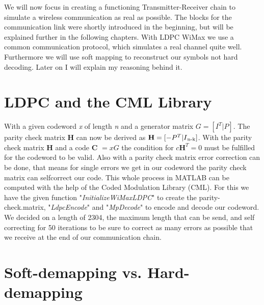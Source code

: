 \documentclass[12pt,oneside, reqno]{report}
\begin{document}
We will now focus in creating a functioning Transmitter-Receiver chain to simulate a wireless communication as real as possible. The blocks for the communication link were shortly introduced in the beginning, but will be explained further in the following chapters. With LDPC WiMax we use a common communication protocol, which simulates a real channel quite well. Furthermore we will use soft mapping to reconstruct our symbols not hard decoding. Later on I will explain my reasoning behind it.  

\section{LDPC and the CML Library}
With a given codeword \textit{x} of length \textit{n} and a generator matrix $G = [I^T|P]$. The parity check matrix \textbf{H} can now be derived as $\textbf{H} = [-P^T|I\textsubscript{n-k}]$. With the parity check matrix \textbf{H} and a code \textbf{C} $= xG$ the condition for $c\textbf{H}^T = 0$ must be fulfilled for the codeword to be valid. 
\newline 
Also with a parity check matrix error correction can be done, that means for single errors we get in our codeword the parity check matrix can selfcorrect our code.
This whole process in MATLAB can be computed with the help of the Coded Modulation Library (CML). For this we have the given function "\textit{InitializeWiMaxLDPC}" to create the parity-check.matrix, "\textit{LdpcEncode}" and "\textit{MpDecode}" to encode and decode our codeword.
We decided on a length of 2304, the maximum length that can be send, and self correcting for 50 iterations to be sure to correct as many errors as possible that we receive at the end of our communication chain.

\section{Soft-demapping vs. Hard-demapping}
\end{document}
